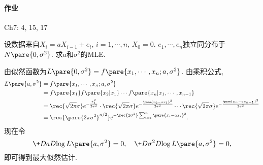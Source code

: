 \documentclass{ctexart}
\begin{document}
\paragraph{作业} %
\label{par:作业}

Ch7: 4, 15, 17


\begin{sample}
    \begin{ex}
        设数据来自$X_i = aX_{i-1}+e_i$, $i = 1,\cdots,n$, $X_0 = 0$. $e_1,\cdots,e_n$独立同分布于$N\pare{0,\sigma^2}$. 求$a$和$\sigma^2$的MLE.
    \end{ex}
    \begin{solution}
        由似然函数为$L\pare{0,\sigma^2} = f\pare{x_1,\cdots,x_n;a,\sigma^2}$. 由乘积公式,
        \begin{align*}
            L\pare{a,\sigma^2} &= f\pare{x_1,\cdots,x_n;a,\sigma^2} \\
            &= f\pare{x_1} f\pare{x_2\vert x_1} \cdots f\pare{x_n\vert x_1,\cdots,x_{n-1}} \\
            &= \rec{\sqrt{2\pi}\sigma} e^{-\frac{x_1^2}{2\sigma^2}} \cdot \rec{\sqrt{2\pi}\sigma}e^{- \frac{\pare{x_2 - ax_1}^2}{2\sigma^2}} \cdots \rec{\sqrt{2\pi}\sigma} e^{- \frac{\pare{x_n - ax_{n-1}}^2}{2\sigma^2}} \\
            &= \rec{\pare{2\pi \sigma^2}^{n/2}}e^{-\rec{2\sigma^2}\sum_{i=1}^n \pare{x_i - ax_i}^2}.
        \end{align*}
        现在令
        \[ \+DaD{\log L\pare{a,\sigma^2}} = 0,\quad \+D{\sigma^2}D{\log L\pare{a,\sigma^2}} = 0, \]
        即可得到最大似然估计.
    \end{solution}
\end{sample}
\end{document}
